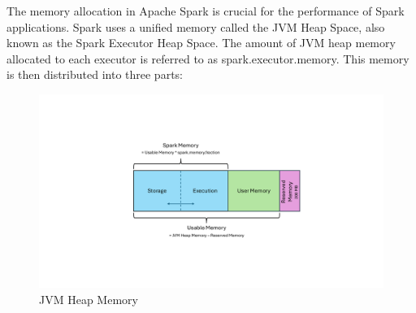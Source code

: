 The memory allocation in Apache Spark is crucial for the performance of Spark applications. Spark uses a unified memory called the JVM Heap Space, also known as the Spark Executor Heap Space. The amount of JVM heap memory allocated to each executor is referred to as spark.executor.memory. This memory is then distributed into three parts: 

\begin{figure}[ht]
    \centering
    \includegraphics[width=0.7\linewidth]{images/Spark_mem_man.pdf}
    \caption{JVM Heap Memory}
    \label{fig:spark-mem-man}
\end{figure}

